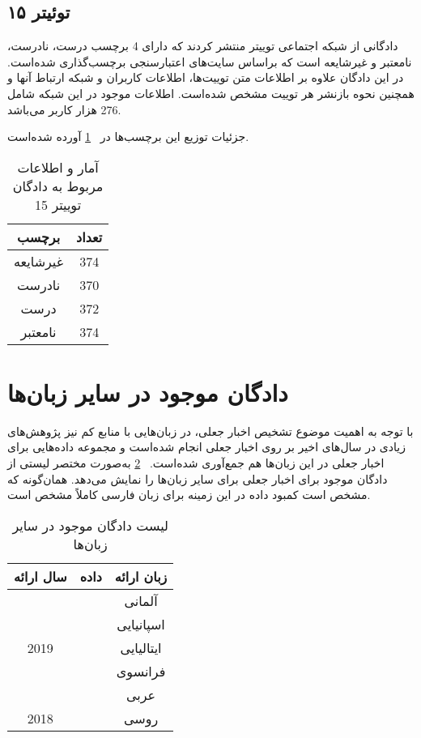 \subsection{توئیتر ۱۵}

\noindent
 \citet{ma2017detect} دادگانی از شبکه اجتماعی توییتر منتشر کردند که دارای 4 برچسب درست، نادرست، نامعتبر و غیرشایعه است که براساس سایت‌های
 اعتبارسنجی برچسب‌گذاری شده‌است.  در این دادگان علاوه بر اطلاعات متن توییت‌ها، اطلاعات کاربران و شبکه ارتباط آنها و همچنین نحوه بازنشر هر توییت مشخص شده‌است. اطلاعات موجود در این شبکه شامل 276 هزار کاربر می‌باشد.
 
 جزئیات توزیع این برچسب‌ها در \tablename~\ref{Twitter15Dataset} آورده شده‌است.

\begin{table}[!h]
\caption{آمار و اطلاعات مربوط به دادگان توییتر 15}
\label{Twitter15Dataset}
\begin{center}
\begin{tabular}{|c|c|}
\hline
برچسب & تعداد \\ 
\hline
\hline
غیرشایعه & 374 \\ \hline
نادرست & 370 \\ \hline
درست & 372 \\ \hline
نامعتبر & 374 \\ \hline
\end{tabular}
\end{center}
\end{table}

\section{دادگان موجود در سایر زبان‌ها}
با توجه به اهمیت موضوع تشخیص اخبار جعلی، در زبان‌هایی با منابع کم نیز پژوهش‌های زیادی در سال‌های اخیر بر روی اخبار
 جعلی انجام شده‌است و مجموعه داده‌هایی برای اخبار جعلی در این زبان‌ها هم جمع‌آوری شده‌است. \tablename~\ref{LowResourceDataset} به‌صورت مختصر
لیستی از دادگان موجود برای اخبار جعلی برای سایر زبان‌ها را نمایش می‌دهد. همان‌گونه که مشخص است کمبود داده در این زمینه برای زبان فارسی کاملاً مشخص است. 

\begin{table}[!h]
\caption{لیست دادگان موجود در سایر زبان‌ها}
\label{LowResourceDataset}
\begin{center}
\begin{tabular}{|c|c|c|}
\hline
سال ارائه & داده & زبان ارائه \\ \hline
\multirow{5}{*}{2019}
& \citep{vogel2019fake} & آلمانی \\ \cline{2-3}
& \citep{reyes2019detection} & اسپانیایی \\ \cline{2-3}
& \citep{vicario2019polarization} & ایتالیایی \\ \cline{2-3}
& \citep{liu2019detection} & فرانسوی \\ \cline{2-3}
& \citep{alkhair2019arabic} & عربی \\ \hline
2018 
& \citep{lozhnikov2018stance} & روسی \\ \hline
\end{tabular}
\end{center}
\end{table}

